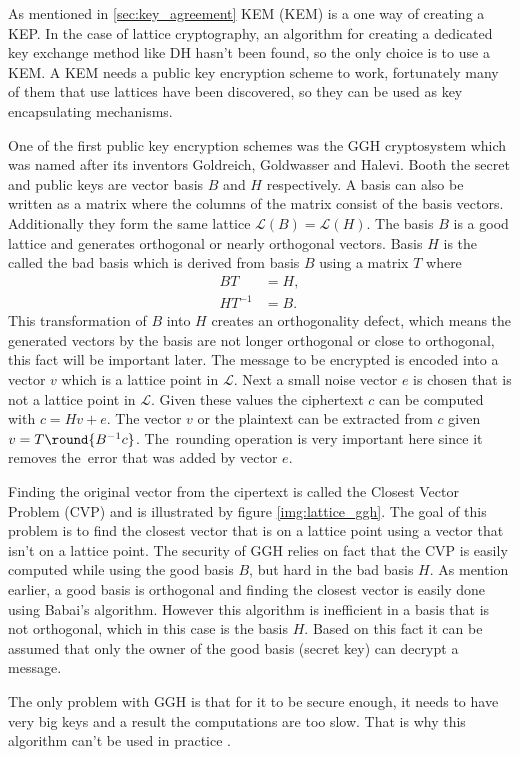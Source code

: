 As mentioned in \ref{sec:key_agreement} KEM (\acl{KEM}) is a one way of creating a KEP. In the case of lattice cryptography, an algorithm for creating a dedicated key exchange method like DH hasn't been found, so the only choice is to use a KEM. A KEM needs a public key encryption scheme to work, fortunately many of them that use lattices have been discovered, so they can be used as key encapsulating mechanisms.

One of the first public key encryption schemes was the GGH cryptosystem which was named after its inventors Goldreich, Goldwasser and Halevi. Booth the secret and public keys are vector basis $B$ and $H$ respectively. A basis can also be written as a matrix where the columns of the matrix consist of the basis vectors. Additionally they form the same lattice $\mathcal{L}(B)=\mathcal{L}(H)$. The basis $B$ is a good lattice and generates orthogonal or nearly orthogonal vectors. Basis $H$ is the called the bad basis which is derived from basis $B$ using a matrix $T$ where
\begin{equation}
  \begin{aligned}
    BT&=H, \\
    HT^{-1}&=B.
  \end{aligned}
\end{equation}
This transformation of $B$ into $H$ creates an orthogonality defect, which means the generated vectors by the basis are not longer orthogonal or close to orthogonal, this fact will be important later. The message to be encrypted is encoded into a vector $v$ which is a lattice point in $\mathcal{L}$. Next a small noise vector $e$ is chosen that is not a lattice point in $\mathcal{L}$. Given these values the ciphertext $c$ can be computed with $c = Hv + e$. The vector $v$ or the plaintext can be extracted from $c$ given $v=T \round{B^{-1}c}$. The~rounding operation is very important here since it removes the~error that was added by vector $e$. \cite{Bernstein2009}\cite{Goldreich1997}


Finding the original vector from the cipertext is called the Closest Vector Problem (CVP) and is illustrated by figure \ref{img:lattice_ggh}. The goal of this problem is to find the closest vector that is on a lattice point using a vector that isn't on a lattice point. The security of GGH relies on fact that the CVP is easily computed while using the good basis $B$, but hard in the bad basis $H$. As mention earlier, a good basis is orthogonal and finding the closest vector is easily done using Babai's algorithm. However this algorithm is inefficient in a basis that is not orthogonal, which in this case is the basis $H$. Based on this fact it can be assumed that only the owner of the good basis (secret key) can decrypt a message. \cite{Goldreich1997}

The only problem with GGH is that for it to be secure enough, it needs to have very big keys and a result the computations are too slow. That is why this algorithm can't be used in practice \cite{Bernstein2009}.
